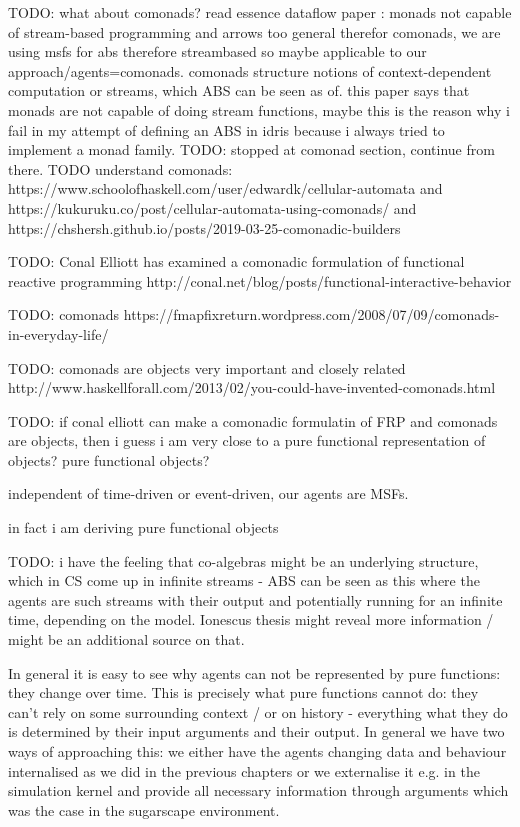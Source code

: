 TODO: what about comonads? read essence dataflow paper \cite{uustalu_essence_2006}: monads not capable of stream-based programming and arrows too general therefor comonads, we are using msfs for abs therefore streambased so maybe applicable to our approach/agents=comonads. comonads structure notions of context-dependent computation or streams, which ABS can be seen as of. this paper says that monads are not capable of doing stream functions, maybe this is the reason why i fail in my attempt of defining an ABS in idris because i always tried to implement a monad family. TODO: stopped at comonad section, continue from there. TODO understand comonads: https://www.schoolofhaskell.com/user/edwardk/cellular-automata and https://kukuruku.co/post/cellular-automata-using-comonads/ and https://chshersh.github.io/posts/2019-03-25-comonadic-builders

TODO: Conal Elliott has examined a comonadic formulation of functional reactive programming http://conal.net/blog/posts/functional-interactive-behavior

TODO: comonads https://fmapfixreturn.wordpress.com/2008/07/09/comonads-in-everyday-life/

TODO: comonads are objects very important and closely related http://www.haskellforall.com/2013/02/you-could-have-invented-comonads.html

TODO: if conal elliott can make a comonadic formulatin of FRP and comonads are objects, then i guess i am very close to a pure functional representation of objects? pure functional objects?


independent of time-driven or event-driven, our agents are MSFs.

in fact i am deriving pure functional objects

TODO: i have the feeling that co-algebras might be an underlying structure, which in CS come up in infinite streams - ABS can be seen as this where the agents are such streams with their output and potentially running for an infinite time, depending on the model. Ionescus thesis might reveal more information / might be an additional source on that.

In general it is easy to see why agents can not be represented by pure functions: they change over time. This is precisely what pure functions cannot do: they can't rely on some surrounding context / or on history - everything what they do is determined by their input arguments and their output. In general we have two ways of approaching this: we either have the agents changing data and behaviour internalised as we did in the previous chapters or we externalise it e.g. in the simulation kernel and provide all necessary information through arguments which was the case in the sugarscape environment.


